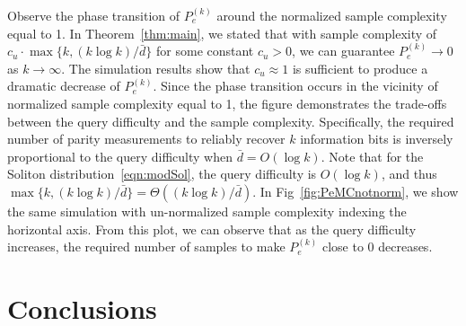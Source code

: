 \documentclass[11pt,onecolumn]{IEEEtran}
\newcommand{\bard}{\bar{d}}
\begin{document}
Observe the phase transition of $P_e^{(k)}$ around the normalized sample complexity equal to 1. In Theorem~\ref{thm:main}, we stated that with sample complexity of $c_u\cdot \max\{k,(k\log k)/\bard\}$ for some constant $c_u>0$, we can guarantee $P_e^{(k)}\to 0$ as $k\to\infty$. The simulation results show that $c_u\approx 1$ is sufficient to produce a dramatic decrease of $P_e^{(k)}$. 
Since the phase transition occurs in the vicinity of normalized sample complexity equal to 1, the figure demonstrates the trade-offs between the query difficulty and the sample complexity. Specifically, the required number of parity measurements to reliably recover $k$ information bits is inversely proportional to the query difficulty when $\bard = O(\log k)$. 
Note that for the Soliton distribution~\eqref{eqn:modSol}, the query difficulty is $O(\log k)$, and thus $\max\{k,(k\log k)/\bard\}=\Theta( (k\log k)/\bard)$. 
In Fig~\ref{fig:PeMCnotnorm}, we show the same simulation with un-normalized sample complexity indexing the horizontal axis. From this plot, we can observe that as the query difficulty increases, the required number of samples to make $P_e^{(k)}$ close to 0 decreases.

\section{Conclusions}\label{sec:con}
\end{document}
